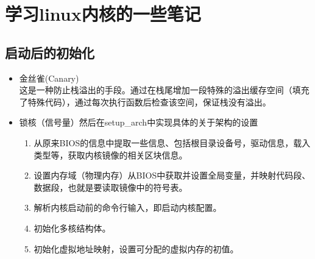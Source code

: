 \section{学习linux内核的一些笔记}
  \subsection{启动后的初始化}
    \begin{itemize}
      \item 金丝雀(Canary)\\
      这是一种防止栈溢出的手段。通过在栈尾增加一段特殊的溢出缓存空间（填充了特殊代码），通过每次执行函数后检查该空间，保证栈没有溢出。
      \item 锁核（信号量）然后在setup\_arch中实现具体的关于架构的设置\\
      	\begin{enumerate}
      		\item[] 从原来BIOS的信息中提取一些信息、包括根目录设备号，驱动信息，载入类型等，获取内核镜像的相关区块信息。
      		\item[] 设置内存域（物理内存）从BIOS中获取并设置全局变量，并映射代码段、数据段，也就是要读取镜像中的符号表。
      		\item[] 解析内核启动前的命令行输入，即启动内核配置。
      		\item[] 初始化多核结构体。
      		\item[]	 初始化虚拟地址映射，设置可分配的虚拟内存的初值。
      		
      	\end{enumerate}
    \end{itemize}